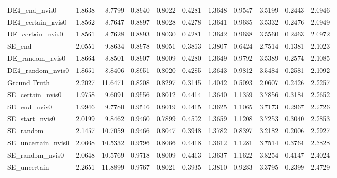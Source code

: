 \begin{tabular}{lrrrrrrrrrr}
DE4_end_nvis0 & 1.8638 & 8.7799 & 0.8940 & 0.8022 & 0.4281 & 1.3648 & 0.9547 & 3.5199 & 0.2443 & 2.0946 \\
DE4_certain_nvis0 & 1.8562 & 8.7647 & 0.8897 & 0.8028 & 0.4278 & 1.3641 & 0.9685 & 3.5332 & 0.2476 & 2.0949 \\
DE_certain_nvis0 & 1.8561 & 8.7628 & 0.8893 & 0.8030 & 0.4281 & 1.3642 & 0.9688 & 3.5560 & 0.2463 & 2.0972 \\
SE_end & 2.0551 & 9.8634 & 0.8978 & 0.8051 & 0.3863 & 1.3807 & 0.6424 & 2.7514 & 0.1381 & 2.1023 \\
DE_random_nvis0 & 1.8664 & 8.8501 & 0.8907 & 0.8009 & 0.4280 & 1.3649 & 0.9792 & 3.5389 & 0.2574 & 2.1085 \\
DE4_random_nvis0 & 1.8651 & 8.8406 & 0.8951 & 0.8020 & 0.4285 & 1.3643 & 0.9812 & 3.5484 & 0.2581 & 2.1092 \\
Ground Truth & 2.2027 & 11.6471 & 0.8208 & 0.8297 & 0.3145 & 1.4042 & 0.5093 & 2.0607 & 0.2426 & 2.2257 \\
SE_certain_nvis0 & 1.9758 & 9.6091 & 0.9556 & 0.8012 & 0.4414 & 1.3640 & 1.1359 & 3.7856 & 0.3184 & 2.2652 \\
SE_end_nvis0 & 1.9946 & 9.7780 & 0.9546 & 0.8019 & 0.4415 & 1.3625 & 1.1065 & 3.7173 & 0.2967 & 2.2726 \\
SE_start_nvis0 & 2.0199 & 9.8462 & 0.9460 & 0.7899 & 0.4502 & 1.3659 & 1.1208 & 3.7253 & 0.3040 & 2.2853 \\
SE_random & 2.1457 & 10.7059 & 0.9466 & 0.8047 & 0.3948 & 1.3782 & 0.8397 & 3.2182 & 0.2006 & 2.2927 \\
SE_uncertain_nvis0 & 2.0668 & 10.5332 & 0.9796 & 0.8066 & 0.4418 & 1.3612 & 1.1281 & 3.7514 & 0.3764 & 2.3828 \\
SE_random_nvis0 & 2.0648 & 10.5769 & 0.9718 & 0.8009 & 0.4413 & 1.3637 & 1.1622 & 3.8254 & 0.4147 & 2.4024 \\
SE_uncertain & 2.2651 & 11.8899 & 0.9767 & 0.8021 & 0.3935 & 1.3810 & 0.9283 & 3.3795 & 0.2399 & 2.4729 \\
\bottomrule
\end{tabular}
